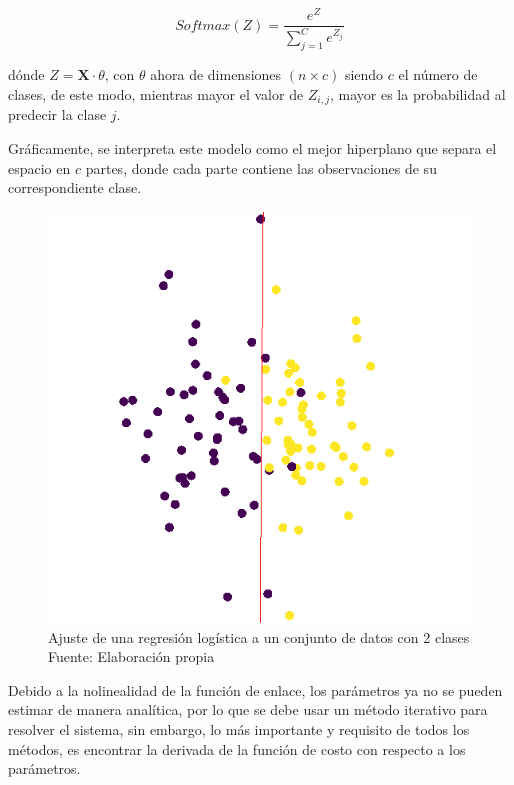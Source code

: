         \begin{equation}
            Softmax(Z) = \frac{e^{Z}}{\sum_{j=1}^{C} e^{Z_j}}
        \end{equation}
        
        \noindent dónde $Z = \mathbf{X}\cdot\theta$, con $\theta$ ahora de dimensiones $(n \times c)$ siendo $c$ el número de clases, de este modo, mientras mayor el valor de $Z_{i,j}$, mayor es la probabilidad al predecir la clase $j$. \citep{Goodfellow-et-al-2016}
        
        Gráficamente, se interpreta este modelo como el mejor hiperplano que separa el espacio en $c$ partes, donde cada parte contiene las observaciones de su correspondiente clase.
        
        \begin{figure}[H]
            \centering
            \includegraphics[scale=0.5]{imagenes/logistic_reg}
            \caption{Ajuste de una regresión logística a un conjunto de datos con 2 clases\\ Fuente: Elaboración propia}
        \end{figure}
        Debido a la nolinealidad de la función de enlace, los parámetros ya no se pueden estimar de manera analítica, por lo que se debe usar un método iterativo para resolver el sistema, sin embargo, lo más importante y requisito de todos los métodos, es encontrar la derivada de la función de costo con respecto a los parámetros.
        
